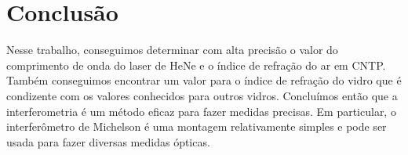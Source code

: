 \section{Conclusão}

Nesse trabalho, conseguimos determinar com alta precisão o valor do comprimento de onda do laser de HeNe e o índice de refração do ar em CNTP. Também conseguimos encontrar um valor para o índice de refração do vidro que é condizente com os valores conhecidos para outros vidros. Concluímos então que a interferometria é um método eficaz para fazer medidas precisas. Em particular, o interferômetro de Michelson é uma montagem relativamente simples e pode ser usada para fazer diversas medidas ópticas. 
